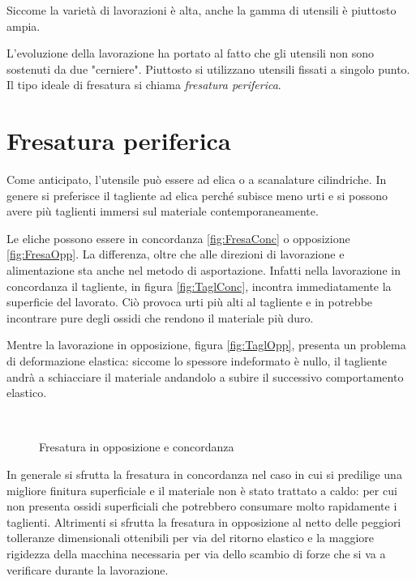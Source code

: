 Siccome la varietà di lavorazioni è alta, anche la gamma di utensili è piuttosto ampia.

L'evoluzione della lavorazione ha portato al fatto che gli utensili non sono sostenuti da due "cerniere".
Piuttosto si utilizzano utensili fissati a singolo punto.
Il tipo ideale di fresatura si chiama \emph{fresatura periferica}.

\section{Fresatura periferica}
Come anticipato, l'utensile può essere ad elica o a scanalature cilindriche. In genere si preferisce il tagliente ad elica perché subisce meno urti e si possono avere più taglienti immersi sul materiale contemporaneamente.
 
Le eliche possono essere in concordanza \ref{fig:FresaConc} o opposizione \ref{fig:FresaOpp}.
La differenza, oltre che alle direzioni di lavorazione e alimentazione sta anche nel metodo di asportazione. 
Infatti nella lavorazione in concordanza il tagliente, in figura \ref{fig:TaglConc}, incontra immediatamente la superficie del lavorato. Ciò provoca urti più alti al tagliente e in potrebbe incontrare pure degli ossidi che rendono il materiale più duro.

Mentre la lavorazione in opposizione, figura \ref{fig:TaglOpp}, presenta un problema di deformazione elastica: siccome lo spessore indeformato è nullo, il tagliente andrà a schiacciare il materiale andandolo a subire il successivo comportamento elastico.

\begin{figure}
\centering
{}\quad
{}\\
\quad
{}
\caption{Fresatura in opposizione e concordanza}\label{fig:DirFresa}
\end{figure}

In generale si sfrutta la fresatura in concordanza nel caso in cui si predilige una migliore finitura superficiale e il materiale non è stato trattato a caldo: per cui non presenta ossidi superficiali che potrebbero consumare molto rapidamente i taglienti.
Altrimenti si sfrutta la fresatura in opposizione al netto delle peggiori tolleranze dimensionali ottenibili per via del ritorno elastico e la maggiore rigidezza della macchina necessaria per via dello scambio di forze che si va a verificare durante la lavorazione.

